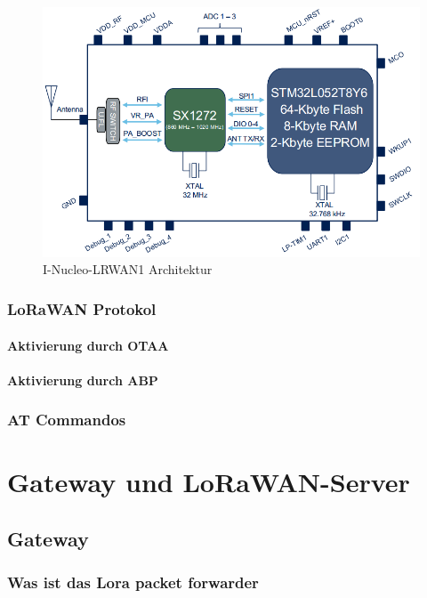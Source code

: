 \begin{figure}[h]
	\centering
	\includegraphics[width=14cm]{source/images/LoRa_Intern}
	\caption{I-Nucleo-LRWAN1 Architektur \cite{LoRaMod}\label{graph:loraMod_intern}}
\end{figure}



\subsection{LoRaWAN Protokol}\label{LoRaWAN_P}
\subsubsection{Aktivierung durch OTAA}
\subsubsection{Aktivierung durch ABP}
\subsection{AT Commandos}\label{AT}


\chapter{Gateway und LoRaWAN-Server}\label{G_S}

\section{Gateway}\label{Gateway}
\subsection{Was ist das Lora packet forwarder}
